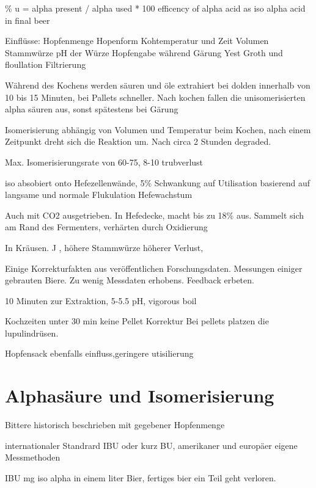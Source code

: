 \documentclass[a4paper,parskip=half]{scrartcl}
\begin{document}
\parencite[124]{Garetz1994} 

\% u = alpha present / alpha used * 100
efficency of alpha acid as iso alpha acid in final beer

Einflüsse:
Hopfenmenge
Hopenform
Kohtemperatur und Zeit
Volumen
Stammwürze
pH der Würze
Hopfengabe während Gärung
Yest Groth und floullation
Filtrierung

\parencite[125]{Garetz1994} 
Während des Kochens werden säuren und öle extrahiert 
bei dolden innerhalb von 10 bis 15 Minuten, bei Pallets
schneller.
Nach kochen fallen die unisomerisierten alpha säuren
aus, sonst spätestens bei Gärung

Isomerisierung abhängig von Volumen und Temperatur beim
Kochen, nach einem Zeitpunkt dreht sich die Reaktion
um. Nach circa 2 Stunden degraded. 

\parencite[126]{Garetz1994} 
Max. Isomerisierungsrate von 60-75, 8-10 trubverlust

iso absobiert onto Hefezellenwände, 5\% Schwankung auf
Utilisation basierend auf langsame und normale Flukulation
Hefewachstum

Auch mit CO2 ausgetrieben. In Hefedecke, macht bis zu 18\%
aus. Sammelt sich am Rand des Fermenters, verhärten durch
Oxidierung

\parencite[133]{Garetz1994} 
In Kräusen. J , höhere Stammwürze höherer Verlust, 

\parencite[128]{Garetz1994} 
Einige Korrekturfakten aus veröffentlichen Forschungsdaten. 
Messungen einiger gebrauten Biere.
Zu wenig Messdaten erhobens. Feedback erbeten.

10 Minuten zur Extraktion, 5-5.5 pH, vigorous boil

\parencite[130]{Garetz1994} 
Kochzeiten unter 30 min keine Pellet Korrektur
Bei pellets platzen die lupulindrüsen. 

Hopfensack ebenfalls einfluss,geringere utisilierung

\section*{Alphasäure und Isomerisierung}

\parencite[120\psq]{Garetz1994}
Bittere historisch beschrieben mit gegebener Hopfenmenge

internationaler Standrard IBU oder kurz BU, amerikaner und
europäer eigene Messmethoden
 
\parencite[121]{Garetz1994} 
IBU mg iso alpha in einem liter Bier, fertiges bier
ein Teil geht verloren. 
\end{document}
